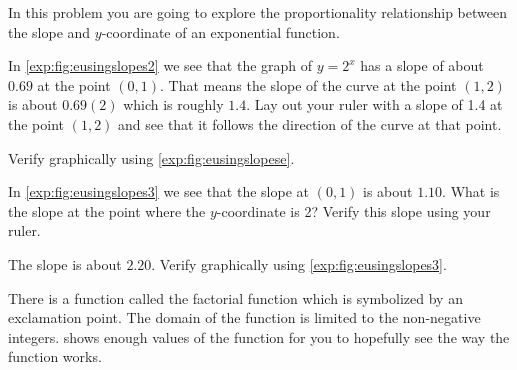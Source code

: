 \begin{exercises}
\begin{problem}[Slopes]
In this problem you are going to explore the proportionality relationship between the slope and $y$-coordinate of an exponential function. 
\begin{subproblem}
	In \cref{exp:fig:eusingslopes2} we see that the graph of $y=2^x$ has a slope of about
	$0.69$ at the point $(0,1)$. That means the slope of the curve at the point 
	$(1,2)$ is about $0.69(2)$ which is roughly $1.4$.
	Lay out your ruler with a slope of 1.4 at the point $(1,2)$  and see 
	that it follows the direction of the curve at that point.
	\begin{shortsolution}
		Verify graphically using \vref{exp:fig:eusingslopese}.
	\end{shortsolution}
\end{subproblem}
\begin{subproblem}
	In \cref{exp:fig:eusingslopes3} we see that the slope at $(0,1)$ is about $1.10$.  What is the slope at the point where the $y$-coordinate is 2?  Verify this slope using your ruler.
	\begin{shortsolution}
		The slope is about $2.20$. Verify graphically using \vref{exp:fig:eusingslopes3}.
	\end{shortsolution}
\end{subproblem}
\end{problem}
\begin{problem}[Factorials]\label{exp:prob:factorials}%
There is a function called the factorial function which is symbolized by 
an exclamation point.  The domain of the function is limited to the 
non-negative integers. 
 shows enough values of the function for you to 
hopefully see the way the function works.
			

\end{problem}
\end{exercises}
